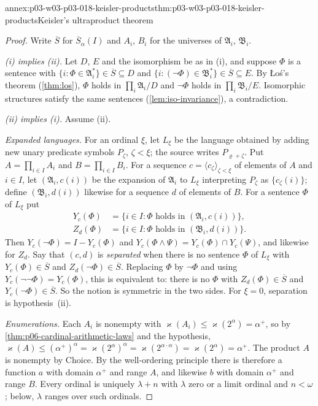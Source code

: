 \begin{annexitem}{annex:p03-w03-p03-018-keisler-products}{thm:p03-w03-p03-018-keisler-products}{Keisler's ultraproduct theorem}
\begin{proof}
Write \(\overline S\) for \(\overline S_\alpha(I)\) and \(A_i\), \(B_i\) for
the universes of \(\mathfrak A_i\), \(\mathfrak B_i\).

\emph{(i) implies (ii).}  Let \(D\), \(E\) and the isomorphism be as in (i),
and suppose \(\Phi\) is a sentence with
\(\{i:\Phi\in\mathfrak A_i^*\}\in\overline S\subseteq D\) and
\(\{i:(\neg\Phi)\in\mathfrak B_i^*\}\in\overline S\subseteq E\).  By
\L o\'s's theorem (\cref{thm:los}), \(\Phi\) holds in
\(\prod_i\mathfrak A_i/D\) and \(\neg\Phi\) holds in
\(\prod_i\mathfrak B_i/E\).  Isomorphic structures satisfy the same sentences
(\cref{lem:iso-invariance}), a contradiction.

\emph{(ii) implies (i).}  Assume (ii).

\emph{Expanded languages.}  For an ordinal \(\xi\), let \(L_\xi\) be the
language obtained by adding new unary predicate symbols \(P_\zeta\),
\(\zeta<\xi\); the source writes \(P_{\varrho+\zeta}\).  Put
\(A=\prod_{i\in I}A_i\) and \(B=\prod_{i\in I}B_i\).  For a sequence
\(c=\langle c_\zeta\rangle_{\zeta<\xi}\) of elements of \(A\) and
\(i\in I\), let \((\mathfrak A_i,c(i))\) be the expansion of
\(\mathfrak A_i\) to \(L_\xi\) interpreting \(P_\zeta\) as
\(\{c_\zeta(i)\}\); define \((\mathfrak B_i,d(i))\) likewise for a sequence
\(d\) of elements of \(B\).  For a sentence \(\Phi\) of \(L_\xi\) put
\begin{align*}
  Y_c(\Phi)&=\{i\in I:\Phi\text{ holds in }(\mathfrak A_i,c(i))\},\\
  Z_d(\Phi)&=\{i\in I:\Phi\text{ holds in }(\mathfrak B_i,d(i))\}.
\end{align*}
Then \(Y_c(\neg\Phi)=I-Y_c(\Phi)\) and
\(Y_c(\Phi\wedge\Psi)=Y_c(\Phi)\cap Y_c(\Psi)\), and likewise for \(Z_d\).
Say that \((c,d)\) is \emph{separated} when there is no sentence \(\Phi\) of
\(L_\xi\) with \(Y_c(\Phi)\in\overline S\) and
\(Z_d(\neg\Phi)\in\overline S\).  Replacing \(\Phi\) by \(\neg\Phi\) and
using \(Y_c(\neg\neg\Phi)=Y_c(\Phi)\), this is equivalent to: there is no
\(\Phi\) with \(Z_d(\Phi)\in\overline S\) and
\(Y_c(\neg\Phi)\in\overline S\).  So the notion is symmetric in the two
sides.  For \(\xi=0\), separation is hypothesis~(ii).

\emph{Enumerations.}  Each \(A_i\) is nonempty with
\(\varkappa(A_i)\le\varkappa(2^\alpha)=\alpha^+\), so by
\cref{thm:p06-cardinal-arithmetic-laws} and the hypothesis,
\(\varkappa(A)\le(\alpha^+)^\alpha=\varkappa(2^\alpha)^\alpha
=\varkappa(2^{\alpha\cdot\alpha})=\varkappa(2^\alpha)=\alpha^+\).  The
product \(A\) is nonempty by Choice.  By the well-ordering principle there is
therefore a function \(a\) with domain \(\alpha^+\) and range \(A\), and
likewise \(b\) with domain \(\alpha^+\) and range \(B\).  Every ordinal is
uniquely \(\lambda+n\) with \(\lambda\) zero or a limit ordinal and
\(n<\omega\); below, \(\lambda\) ranges over such ordinals.


\end{proof}
\end{annexitem}
